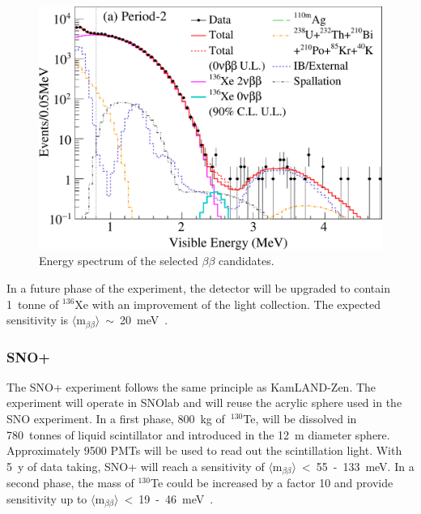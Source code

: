 \documentclass[main.tex]{subfiles}
\begin{document}
\begin{figure}[h!]
\begin{center}
\includegraphics[scale=0.5]{pictures/Chap2/fig2a.pdf}
\caption{Energy spectrum of the selected $\beta\beta$ candidates.}
\label{KamLANDZenResults}
\end{center}
\end{figure}



\NI In a future phase of the experiment, the detector will be upgraded to contain 1~tonne of $^{\text{136}}$Xe with an improvement of the light collection. The expected sensitivity is $\langle \text{m}_{\beta\beta} \rangle$~$\sim$~20~meV~\cite{KamLAND-Zen3}.


\FloatBarrier


\subsubsection{SNO+}


\NI The SNO+ experiment follows the same principle as KamLAND-Zen. The experiment will operate in SNOlab and will reuse the acrylic sphere used in the SNO experiment. In a first phase, 800~kg of~$^{\text{130}}$Te, will be dissolved in 780~tonnes of liquid scintillator and introduced in the 12~m diameter sphere. Approximately 9500 PMTs will be used to read out the scintillation light. With 5~y of data taking, SNO+ will reach a sensitivity of $\langle \text{m}_{\beta\beta} \rangle$~<~55~-~133~meV. In a second phase, the mass of $^{\text{130}}$Te could be increased by a factor 10 and provide sensitivity up to  $\langle \text{m}_{\beta\beta} \rangle$~<~19~-~46~meV~\cite{SNO+}.
\end{document}
